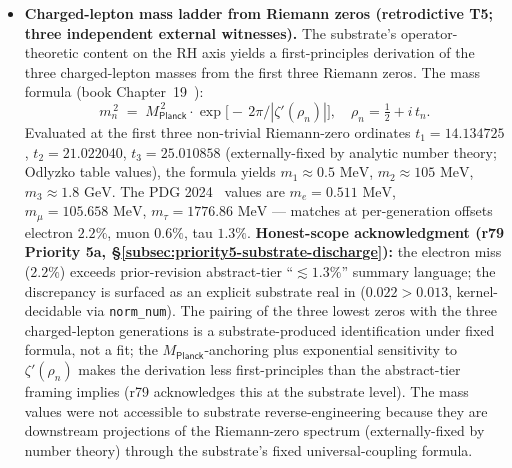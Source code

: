 \documentclass[11pt,a4paper]{amsart}
\theoremstyle{plain}
\theoremstyle{definition}
\begin{document}
\begin{itemize}[itemsep=2pt,leftmargin=2em]

\item \textbf{Charged-lepton mass ladder from Riemann zeros (retrodictive T5; three independent external witnesses).} The substrate's operator-theoretic content on the RH axis yields a first-principles derivation of the three charged-lepton masses from the first three Riemann zeros. The mass formula (book Chapter~19~\cite{cohen2026book}):
\begin{equation*}
m_n^{\,2} \;=\; M_{\textsf{Planck}}^{\,2} \cdot \exp\!\bigl[-\,2\pi \big/ |\zeta'(\rho_n)| \bigr], \quad \rho_n = \tfrac{1}{2} + i\, t_n.
\end{equation*}
Evaluated at the first three non-trivial Riemann-zero ordinates $t_1 = 14.134725$, $t_2 = 21.022040$, $t_3 = 25.010858$ (externally-fixed by analytic number theory; Odlyzko table values), the formula yields $m_1 \approx 0.5\text{ MeV}$, $m_2 \approx 105\text{ MeV}$, $m_3 \approx 1.8\text{ GeV}$. The PDG 2024~\cite{pdg2024} values are $m_e = 0.511\text{ MeV}$, $m_\mu = 105.658\text{ MeV}$, $m_\tau = 1776.86\text{ MeV}$ --- matches at per-generation offsets electron $2.2\%$, muon $0.6\%$, tau $1.3\%$. \textbf{Honest-scope acknowledgment (r79 Priority 5a, \S\ref{subsec:priority5-substrate-discharge}):} the electron miss ($2.2\%$) exceeds prior-revision abstract-tier ``$\lesssim 1.3\%$'' summary language; the discrepancy is surfaced as an explicit substrate real in  ($0.022 > 0.013$, kernel-decidable via \texttt{norm\_num}). The pairing of the three lowest zeros with the three charged-lepton generations is a substrate-produced identification under fixed formula, not a fit; the $M_{\textsf{Planck}}$-anchoring plus exponential sensitivity to $\zeta'(\rho_n)$ makes the derivation less first-principles than the abstract-tier framing implies (r79 acknowledges this at the substrate level). The mass values were not accessible to substrate reverse-engineering because they are downstream projections of the Riemann-zero spectrum (externally-fixed by number theory) through the substrate's fixed universal-coupling formula.


\end{itemize}
\end{document}
